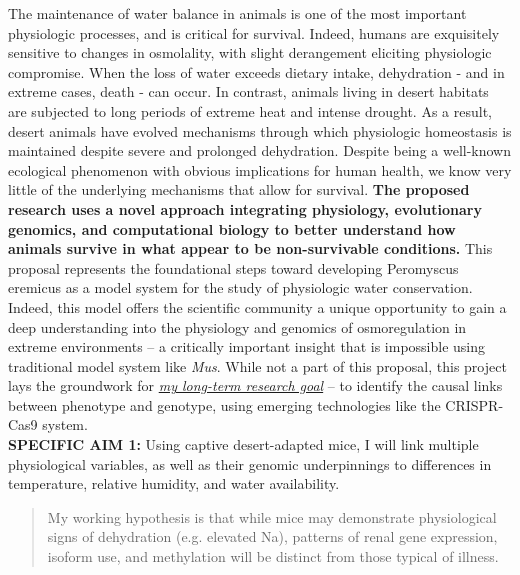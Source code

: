 \documentclass[11pt]{article}
\begin{document}
\setlength{\parindent}{1cm}
\setcounter{page}{0}



\pagestyle{fancy}
\setcounter{page}{1}

The maintenance of water balance in animals is one of the most important physiologic processes, and is critical for survival. Indeed, humans are exquisitely sensitive to changes in osmolality, with slight derangement eliciting physiologic compromise. When the loss of water exceeds dietary intake, dehydration - and in extreme cases, death - can occur.  In contrast, animals living in desert habitats are subjected to long periods of extreme heat and intense drought.  As a result, desert animals have evolved mechanisms through which physiologic homeostasis is maintained despite severe and prolonged dehydration. Despite being a well-known ecological phenomenon with obvious implications for human health, we know very little of the underlying mechanisms that allow for survival. \textbf{The proposed research uses a novel approach integrating physiology, evolutionary genomics, and computational biology to better understand how animals survive in what appear to be non-survivable conditions.} This proposal represents the foundational steps toward developing Peromyscus eremicus as a model system for the study of physiologic water conservation. Indeed, this model offers the scientific community a unique opportunity to gain a deep understanding into the physiology and genomics of osmoregulation in extreme environments – a critically important insight that is impossible using traditional model system like \textit{Mus}. While not a part of this proposal, this project lays the groundwork for \ul{\emph{my long-term research goal}} – to identify the causal links between phenotype and genotype, using emerging technologies like the CRISPR-Cas9 system. \\

\noindent \textbf{SPECIFIC AIM 1:} Using captive desert-adapted mice, I will link multiple physiological variables, as well as their genomic underpinnings to differences in temperature, relative humidity, and water availability.

\begin{quote}



My working hypothesis is that while mice may demonstrate physiological signs of dehydration (e.g. elevated Na), patterns of renal gene expression, isoform use, and methylation will be distinct from those typical of illness.

\end{quote}
\end{document}
